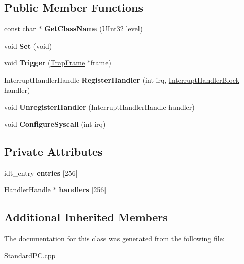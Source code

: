 \subsection*{Public Member Functions}
\begin{DoxyCompactItemize}
\item 
\mbox{\label{class_standard_p_c___internal_1_1_interrupts_a2eece12d584b787901971a94d5ed3135}} 
const char $\ast$ {\bfseries Get\+Class\+Name} (U\+Int32 level)
\item 
\mbox{\label{class_standard_p_c___internal_1_1_interrupts_a0f2ae13585f232a6d1a45cb7af914fd2}} 
void {\bfseries Set} (void)
\item 
\mbox{\label{class_standard_p_c___internal_1_1_interrupts_a033ef1718b6adb74d888ec27871e61fe}} 
void {\bfseries Trigger} (\hyperlink{struct_trap_frame}{Trap\+Frame} $\ast$frame)
\item 
\mbox{\label{class_standard_p_c___internal_1_1_interrupts_a8b241fed09acc33b3882d7893b89f94e}} 
Interrupt\+Handler\+Handle {\bfseries Register\+Handler} (int irq, \hyperlink{classbicycle_1_1function}{Interrupt\+Handler\+Block} handler)
\item 
\mbox{\label{class_standard_p_c___internal_1_1_interrupts_ac0ca6665236b24acfc6d3ab76c34721a}} 
void {\bfseries Unregister\+Handler} (Interrupt\+Handler\+Handle handler)
\item 
\mbox{\label{class_standard_p_c___internal_1_1_interrupts_a1c591f63469c59115bd838470e295b27}} 
void {\bfseries Configure\+Syscall} (int irq)
\end{DoxyCompactItemize}
\subsection*{Private Attributes}
\begin{DoxyCompactItemize}
\item 
\mbox{\label{class_standard_p_c___internal_1_1_interrupts_a1daba8c0d6bd4d51be827f60e1c5ff15}} 
idt\+\_\+entry {\bfseries entries} \mbox{[}256\mbox{]}
\item 
\mbox{\label{class_standard_p_c___internal_1_1_interrupts_a6c7ddb0271a06de58d9c4339ec8d4d54}} 
\hyperlink{class_standard_p_c___internal_1_1_interrupts_1_1_handler_handle}{Handler\+Handle} $\ast$ {\bfseries handlers} \mbox{[}256\mbox{]}
\end{DoxyCompactItemize}
\subsection*{Additional Inherited Members}


The documentation for this class was generated from the following file\+:\begin{DoxyCompactItemize}
\item 
Standard\+P\+C.\+cpp\end{DoxyCompactItemize}
